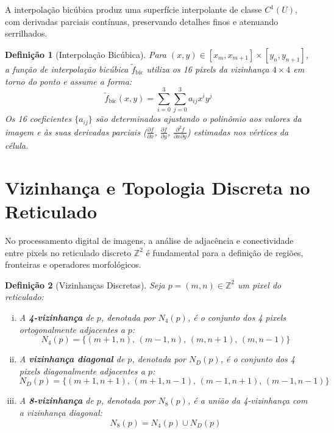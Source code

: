 \documentclass[a4paper,12pt]{report}
\newtheorem{Defini}{\bf Definição}
\begin{document}
A interpolação bicúbica produz uma superfície interpolante de classe $C^1(U)$, com derivadas parciais contínuas, preservando detalhes finos e atenuando serrilhados.

\begin{Defini}[Interpolação Bicúbica]
Para $(x,y) \in [x_m, x_{m+1}] \times [y_n, y_{n+1}]$, a função de interpolação bicúbica $\tilde{f}_{\text{bic}}$ utiliza os 16 pixels da vizinhança $4 \times 4$ em torno do ponto e assume a forma:
\begin{equation}
\tilde{f}_{\text{bic}}(x,y) = \sum_{i=0}^{3} \sum_{j=0}^{3} a_{ij} x^i y^j
\end{equation}
Os 16 coeficientes $\{a_{ij}\}$ são determinados ajustando o polinômio aos valores da imagem e às suas derivadas parciais ($\frac{\partial f}{\partial x}$, $\frac{\partial f}{\partial y}$, $\frac{\partial^2 f}{\partial x \partial y}$) estimadas nos vértices da célula.
\end{Defini}

\section{Vizinhança e Topologia Discreta no Reticulado}

No processamento digital de imagens, a análise de adjacência e conectividade entre pixels no reticulado discreto $\mathbb{Z}^2$ é fundamental para a definição de regiões, fronteiras e operadores morfológicos.

\begin{Defini}[Vizinhanças Discretas]
Seja $p = (m,n) \in \mathbb{Z}^2$ um pixel do reticulado:
\begin{enumerate}[(i)]
	\item A \textbf{4-vizinhança} de $p$, denotada por $N_4(p)$, é o conjunto dos 4 pixels ortogonalmente adjacentes a $p$:
	\begin{equation}
	N_4(p) = \big\{ (m+1, n), \, (m-1, n), \, (m, n+1), \, (m, n-1) \big\}
	\end{equation}
	\item A \textbf{vizinhança diagonal} de $p$, denotada por $N_D(p)$, é o conjunto dos 4 pixels diagonalmente adjacentes a $p$:
	\begin{equation}
	N_D(p) = \big\{ (m+1, n+1), \, (m+1, n-1), \, (m-1, n+1), \, (m-1, n-1) \big\}
	\end{equation}
	\item A \textbf{8-vizinhança} de $p$, denotada por $N_8(p)$, é a união da 4-vizinhança com a vizinhança diagonal:
	\begin{equation}
	N_8(p) = N_4(p) \cup N_D(p)
	\end{equation}
\end{enumerate}
\end{Defini}
	
\end{document}
